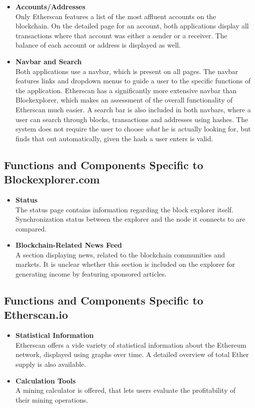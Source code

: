 \begin{itemize}
\item \textbf{Accounts/Addresses}\\
Only Etherscan features a list of the most affluent accounts on the blockchain. On the detailed page for an account, both applications display all transactions where that account was either a sender or a receiver. The balance of each account or address is displayed as well.
\item \textbf{Navbar and Search}\\
Both applications use a navbar, which is present on all pages. The navbar features links and dropdown menus to guide a user to the specific functions of the application. Etherscan has a significantly more extensive navbar than Blockexplorer, which makes an assessment of the overall functionality of Etherscan much easier. A search bar is also included in both navbars, where a user can search through blocks, transactions and addresses using hashes. The system does not require the user to choose \emph{what} he is actually looking for, but finds that out automatically, given the hash a user enters is valid.
\end{itemize}

\subsection{Functions and Components Specific to Blockexplorer.com}

\begin{itemize}
\item \textbf{Status}\\
The status page contains information regarding the block explorer itself. Synchronization status between the explorer and the node it connects to are compared.
\item \textbf{Blockchain-Related News Feed}\\
A section displaying news, related to the blockchain communities and markets. It is unclear whether this section is included on the explorer for generating income by featuring sponsored articles.
\end{itemize}

\subsection{Functions and Components Specific to Etherscan.io}

\begin{itemize}
\item \textbf{Statistical Information}\\
Etherscan offers a vide variety of statistical information about the Ethereum network, displayed using graphs over time. A detailed overview of total Ether supply is also available.
\item \textbf{Calculation Tools}\\
A mining calculator is offered, that lets users evaluate the profitability of their mining operations. 
\end{itemize}

